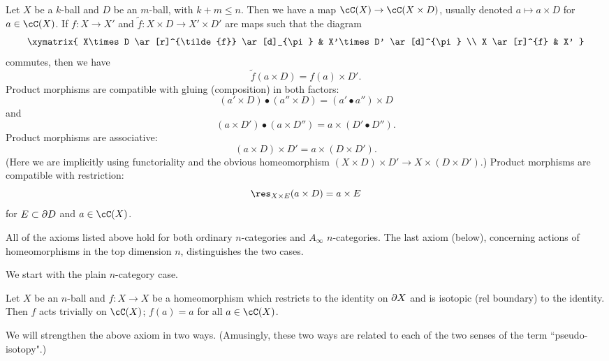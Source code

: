 {Let $X$ be a $k$-ball and $D$ be an $m$-ball, with $k+m \le n$.
Then we have a map $\cC(X)\to \cC(X\times D)$, usually denoted $a\mapsto a\times D$ for $a\in \cC(X)$.
If $f:X\to X'$ and $\tilde{f}:X\times D \to X'\times D'$ are maps such that the diagram
\[ \xymatrix{
	X\times D \ar[r]^{\tilde{f}} \ar[d]_{\pi} & X'\times D' \ar[d]^{\pi} \\
	X \ar[r]^{f} & X'
} \]
commutes, then we have 
\[
	\tilde{f}(a\times D) = f(a)\times D' .
\]
Product morphisms are compatible with gluing (composition) in both factors:
\[
	(a'\times D)\bullet(a''\times D) = (a'\bullet a'')\times D
\]
and
\[
	(a\times D')\bullet(a\times D'') = a\times (D'\bullet D'') .
\]
Product morphisms are associative:
\[
	(a\times D)\times D' = a\times (D\times D') .
\]
(Here we are implicitly using functoriality and the obvious homeomorphism
$(X\times D)\times D' \to X\times(D\times D')$.)
Product morphisms are compatible with restriction:
\[
	\res_{X\times E}(a\times D) = a\times E
\]
for $E\subset \partial D$ and $a\in \cC(X)$.
}



All of the axioms listed above hold for both ordinary $n$-categories and $A_\infty$ $n$-categories.
The last axiom (below), concerning actions of 
homeomorphisms in the top dimension $n$, distinguishes the two cases.

We start with the plain $n$-category case.

{Let $X$ be an $n$-ball and $f: X\to X$ be a homeomorphism which restricts
to the identity on $\partial X$ and is isotopic (rel boundary) to the identity.
Then $f$ acts trivially on $\cC(X)$; $f(a) = a$ for all $a\in \cC(X)$.}

We will strengthen the above axiom in two ways.
(Amusingly, these two ways are related to each of the two senses of the term
``pseudo-isotopy".)

